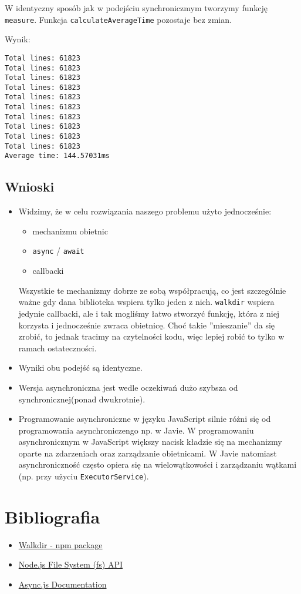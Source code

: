 \documentclass[11pt]{article}
\begin{document}
W identyczny sposób jak w podejściu synchroniczmym tworzymy funkcję \texttt{measure}. Funkcja
\texttt{calculateAverageTime} pozostaje bez zmian.

Wynik:
\begin{tcolorbox}
\begin{Verbatim}
Total lines: 61823
Total lines: 61823
Total lines: 61823
Total lines: 61823
Total lines: 61823
Total lines: 61823
Total lines: 61823
Total lines: 61823
Total lines: 61823
Total lines: 61823
Average time: 144.57031ms
\end{Verbatim}


\end{tcolorbox}
\subsection*{Wnioski}
\label{sec:org61f3d43}
\begin{itemize}
\item Widzimy, że w celu rozwiązania naszego problemu użyto jednocześnie:
\begin{itemize}
\item mechanizmu obietnic
\item \texttt{async} / \texttt{await}
\item callbacki
\end{itemize}

Wszystkie te mechanizmy dobrze ze sobą współpracują, co jest szczególnie ważne
gdy dana biblioteka wspiera tylko jeden z nich. \texttt{walkdir} wspiera jedynie
callbacki, ale i tak mogliśmy łatwo stworzyć funkcję, która z niej korzysta
i jednocześnie zwraca obietnicę. Choć takie ''mieszanie'' da się zrobić, to jednak
tracimy na czytelności kodu, więc lepiej robić to tylko w ramach ostateczności.
\item Wyniki obu podejść są identyczne.
\item Wersja asynchroniczna jest wedle oczekiwań dużo szybsza od synchronicznej(ponad dwukrotnie).
\item Programowanie asynchroniczne w języku JavaScript silnie różni się od
programowania asynchroniczengo np. w Javie. W programowaniu asynchronicznym w
JavaScript większy nacisk kładzie się na mechanizmy oparte na zdarzeniach oraz
zarządzanie obietnicami. W Javie natomiast asynchroniczność często
opiera się na wielowątkowości i zarządzaniu wątkami (np. przy użyciu
\texttt{ExecutorService}).
\end{itemize}
\section*{Bibliografia}
\label{sec:org8ef898c}
\begin{itemize}
\item \href{https://www.npmjs.com/package/walkdir}{Walkdir - npm package}
\item \href{https://nodejs.org/api/fs.html}{Node.js File System (fs) API}
\item \href{https://caolan.github.io/async/v3/docs.html}{Async.js Documentation}
\end{itemize}
\end{document}
